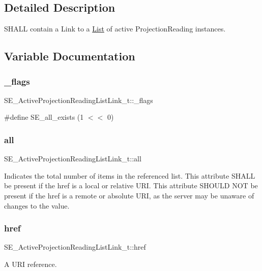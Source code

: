 \subsection{Detailed Description}
S\+H\+A\+LL contain a Link to a \hyperlink{structList}{List} of active Projection\+Reading instances. 

\subsection{Variable Documentation}
\mbox{\label{group__ActiveProjectionReadingListLink_ga6816bac33a95b7122188dfd08ed74309}} 
\subsubsection{\texorpdfstring{\+\_\+flags}{\_flags}}
{\footnotesize\ttfamily S\+E\+\_\+\+Active\+Projection\+Reading\+List\+Link\+\_\+t\+::\+\_\+flags}

\#define S\+E\+\_\+all\+\_\+exists (1 $<$$<$ 0) \mbox{\label{group__ActiveProjectionReadingListLink_gaac6fb00ec846fd582cfa39237ddcdb81}} 
\subsubsection{\texorpdfstring{all}{all}}
{\footnotesize\ttfamily S\+E\+\_\+\+Active\+Projection\+Reading\+List\+Link\+\_\+t\+::all}

Indicates the total number of items in the referenced list. This attribute S\+H\+A\+LL be present if the href is a local or relative U\+RI. This attribute S\+H\+O\+U\+LD N\+OT be present if the href is a remote or absolute U\+RI, as the server may be unaware of changes to the value. \mbox{\label{group__ActiveProjectionReadingListLink_ga4ad9d924109e8d23a60f84f807a6e316}} 
\subsubsection{\texorpdfstring{href}{href}}
{\footnotesize\ttfamily S\+E\+\_\+\+Active\+Projection\+Reading\+List\+Link\+\_\+t\+::href}

A U\+RI reference. 